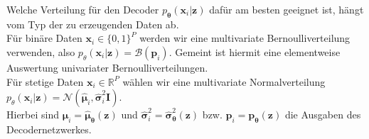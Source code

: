\documentclass[12pt]{article}
\newcommand{\pdec}{p_{\boldsymbol\theta}(\mathbf{x}_i|\mathbf{z})}
\begin{document}
	Welche Verteilung für den Decoder $\pdec$ dafür am besten geeignet ist, hängt vom Typ der zu erzeugenden Daten ab.\\ Für binäre Daten  $\textbf{x}_{i} \in \{0,1\}^{P}$ werden wir eine multivariate Bernoulliverteilung verwenden, also $p_{\theta}(\textbf{x}_{i}|\textbf{z}) =  \mathcal{B}(\boldsymbol{p}_{i})$. Gemeint ist hiermit eine elementweise Auswertung univariater Bernoulliverteilungen.\\
	Für stetige Daten $\textbf{x}_{i} \in \mathbb{R}^{P}$ wählen wir eine multivariate Normalverteilung $p_{\theta}(\textbf{x}_{i}|\textbf{z}) = \mathcal{N}(\boldsymbol{\hat{\mu}}_{i},\boldsymbol{\hat{\sigma}}_{i}^{2}\textbf{I})$.\\
	Hierbei sind $\boldsymbol{\hat{\mu}}_{i} = \boldsymbol{\hat{\mu}}_{\boldsymbol\theta}(\textbf{z})$ und $\boldsymbol{\hat{\sigma}}_{i}^{2} = \boldsymbol{\hat{\sigma}}_{\boldsymbol\theta}^{2}(\textbf{z}) $ bzw. $\textbf{p}_{i} = \textbf{p}_{\boldsymbol\theta}(\textbf{z})$ die Ausgaben des Decodernetzwerkes.\newpage
\end{document}
